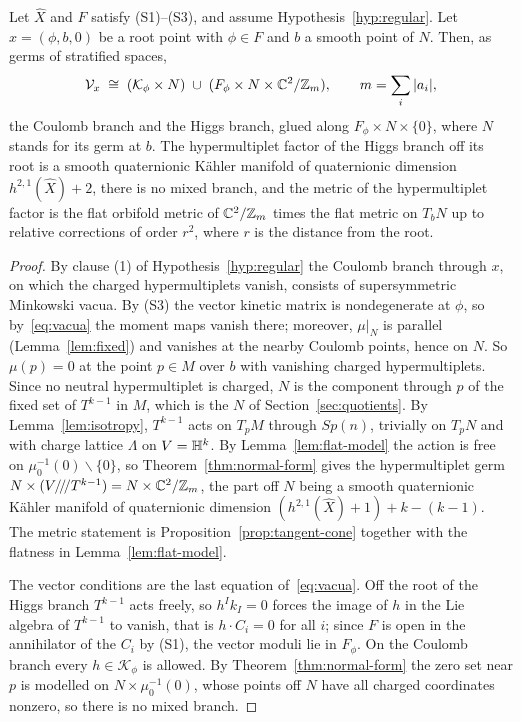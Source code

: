 \begin{theorem}\label{thm:general}
Let $\widehat X$ and $F$ satisfy (S1)--(S3), and assume Hypothesis~\ref{hyp:regular}. Let
$x=(\phi,b,0)$ be a root point with $\phi\in F$ and $b$ a smooth point of $N$. Then, as germs
of stratified spaces,
\begin{equation}
 \mathcal V_x\;\cong\;(\mathcal K_\phi\times N)\;\cup\;
 (F_\phi\times N\times\mathbb C^2/\mathbb Z_m),\qquad m=\sum_i|a_i|,
 \label{eq:thm-general}
\end{equation}
the Coulomb branch and the Higgs branch, glued along $F_\phi\times N\times\{0\}$, where $N$
stands for its germ at $b$. The hypermultiplet factor of the Higgs branch off its root is a
smooth quaternionic K\"ahler manifold of quaternionic dimension $h^{2,1}(\widehat X)+2$, there is
no mixed branch, and the metric of the hypermultiplet factor is the flat orbifold metric of
$\mathbb C^2/\mathbb Z_m$ times the flat metric on $T_bN$ up to relative corrections of order $r^2$, where
$r$ is the distance from the root.
\end{theorem}

\begin{proof}
By clause (1) of Hypothesis~\ref{hyp:regular} the Coulomb branch through $x$, on which the
charged hypermultiplets vanish, consists of supersymmetric Minkowski vacua. By (S3) the vector
kinetic matrix is nondegenerate at $\phi$, so by~\eqref{eq:vacua} the moment maps vanish there;
moreover, $\mu|_N$ is parallel (Lemma~\ref{lem:fixed}) and vanishes at the nearby Coulomb
points, hence on $N$. So $\mu(p)=0$ at the point $p\in M$ over $b$ with vanishing charged
hypermultiplets. Since no neutral hypermultiplet is charged, $N$ is the component through $p$ of
the fixed set of $T^{k-1}$ in $M$, which is the $N$ of Section~\ref{sec:quotients}. By Lemma~\ref{lem:isotropy}, $T^{k-1}$ acts on $T_pM$ through $Sp(n)$,
trivially on $T_pN$ and with charge lattice $\Lambda$ on $V=\mathbb H^k$. By
Lemma~\ref{lem:flat-model} the action is free on $\mu_0^{-1}(0)\smallsetminus\{0\}$, so
Theorem~\ref{thm:normal-form} gives the hypermultiplet germ $N\times(V/\!/\!/T^{k-1})=N\times
\mathbb C^2/\mathbb Z_m$, the part off $N$ being a smooth quaternionic K\"ahler manifold of quaternionic
dimension $(h^{2,1}(\widehat X)+1)+k-(k-1)$. The metric statement is
Proposition~\ref{prop:tangent-cone} together with the flatness in Lemma~\ref{lem:flat-model}.

The vector conditions are the last equation of~\eqref{eq:vacua}. Off the root of the Higgs
branch $T^{k-1}$ acts freely, so $h^Ik_I=0$ forces the image of $h$ in the Lie algebra of
$T^{k-1}$ to vanish, that is $h\cdot C_i=0$ for all $i$; since $F$ is open in the annihilator of
the $C_i$ by (S1), the vector moduli lie in $F_\phi$. On the Coulomb branch every
$h\in\mathcal K_\phi$ is allowed. By Theorem~\ref{thm:normal-form} the zero set near $p$ is
modelled on $N\times\mu_0^{-1}(0)$, whose points off $N$ have all charged coordinates nonzero,
so there is no mixed branch.
\end{proof}


